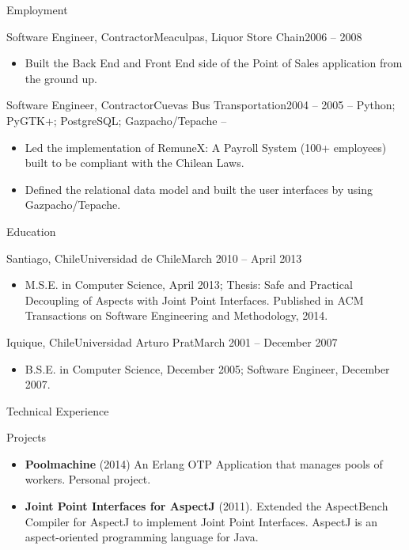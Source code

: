 \documentclass[]{mcdowellcv}
\begin{document}
\begin{cvsection}{Employment}
\begin{cvsubsection}{Software Engineer, Contractor}{Meaculpas, Liquor Store Chain}{2006 -- 2008}
\begin{itemize}
				\item Built the Back End and Front End side of the Point of Sales application from the ground up.
			\end{itemize}
		\end{cvsubsection}
		\begin{cvsubsection}{Software Engineer, Contractor}{Cuevas Bus Transportation}{2004 -- 2005}
			-- Python; PyGTK+; PostgreSQL; Gazpacho/Tepache --
			\begin{itemize}
				\item Led the implementation of RemuneX: A Payroll System (100+ employees) built to be compliant with the Chilean Laws.
				\item Defined the relational data model and built the user interfaces by using Gazpacho/Tepache.
			\end{itemize}
		\end{cvsubsection}
	\end{cvsection}
	
	\begin{cvsection}{Education}
		\begin{cvsubsection}{Santiago, Chile}{Universidad de Chile}{March 2010 --  April 2013}
			\begin{itemize}
				\item M.S.E. in Computer Science, April 2013; Thesis: Safe and Practical Decoupling of Aspects with Joint Point Interfaces. Published in ACM Transactions on Software Engineering and Methodology, 2014.
			\end{itemize}
		\end{cvsubsection}
		\begin{cvsubsection}{Iquique, Chile}{Universidad Arturo Prat}{March 2001 --  December 2007}
			\begin{itemize}
				\item B.S.E. in Computer Science, December 2005; Software Engineer, December 2007.
			\end{itemize}
		\end{cvsubsection}
	\end{cvsection}
	
	\begin{cvsection}{Technical Experience}
		\begin{cvsubsection}{Projects}{}{}
			\begin{itemize}
				\item \textbf{Poolmachine} (2014) An Erlang OTP Application that manages pools of workers. Personal project.
				\item \textbf{Joint Point Interfaces for AspectJ} (2011). Extended the AspectBench Compiler for AspectJ to implement Joint Point Interfaces. AspectJ is an aspect-oriented programming language for Java.
			\end{itemize}
		\end{cvsubsection}
	\end{cvsection}
	
\end{document}
